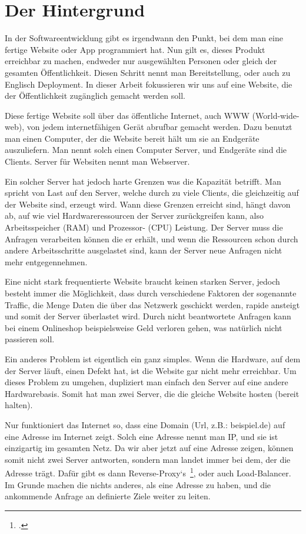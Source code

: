 \newpage
\section{Der Hintergrund}
In der Softwareentwicklung gibt es irgendwann den Punkt, bei dem man eine fertige Website oder App programmiert hat. Nun gilt es, dieses Produkt erreichbar zu machen, endweder nur ausgewählten Personen oder gleich der gesamten Öffentlichkeit.
Diesen Schritt nennt man Bereitstellung, oder auch zu Englisch Deployment. In dieser Arbeit fokussieren wir uns auf eine Website, die der Öffentlichkeit zugänglich gemacht werden soll. 

Diese fertige Website soll über das öffentliche Internet, auch WWW (World-wide-web), von jedem internetfähigen Gerät abrufbar gemacht werden. Dazu benutzt man einen Computer,
der die Website bereit hält um sie an Endgeräte auszuliefern. Man nennt solch einen Computer Server, und Endgeräte sind die Clients. Server für Websiten nennt man Webserver.

Ein solcher Server hat jedoch harte Grenzen was die Kapazität betrifft. Man spricht von Last auf den Server, welche durch zu viele Clients, die gleichzeitig auf der Website sind, erzeugt wird.
Wann diese Grenzen erreicht sind, hängt davon ab, auf wie viel Hardwareressourcen der Server zurückgreifen kann, also Arbeitsspeicher (RAM) und Prozessor- (CPU) Leistung. Der Server muss die Anfragen
verarbeiten können die er erhält, und wenn die Ressourcen schon durch andere Arbeitsschritte ausgelastet sind, kann der Server neue Anfragen nicht mehr entgegennehmen.

Eine nicht stark frequentierte Website braucht keinen starken Server, jedoch besteht immer die Möglichkeit, dass durch verschiedene Faktoren der sogenannte Traffic, die Menge Daten die über das Netzwerk geschickt werden, rapide ansteigt und 
somit der Server überlastet wird. Durch nicht beantwortete Anfragen kann bei einem Onlineshop beispielsweise Geld verloren gehen, was natürlich nicht passieren soll.

Ein anderes Problem ist eigentlich ein ganz simples. Wenn die Hardware, auf dem der Server läuft, einen Defekt hat, ist die Website gar nicht mehr erreichbar.
Um dieses Problem zu umgehen, dupliziert man einfach den Server auf eine andere Hardwarebasis. Somit hat man zwei Server, die die gleiche Website hosten (bereit halten).

Nur funktioniert das Internet so, dass eine Domain (Url, z.B.: beispiel.de) auf eine Adresse im Internet zeigt. Solch eine Adresse nennt man IP, und sie ist einzigartig im gesamten Netz.
Da wir aber jetzt auf eine Adresse zeigen, können somit nicht zwei Server antworten, sondern man landet immer bei dem, der die Adresse trägt.
Dafür gibt es dann Reverse-Proxy`s~\footcite[Vgl. ][]{website:proxy}, oder auch Load-Balancer. Im Grunde machen die nichts anderes, als eine Adresse zu haben, und die ankommende Anfrage an definierte Ziele weiter zu leiten.

